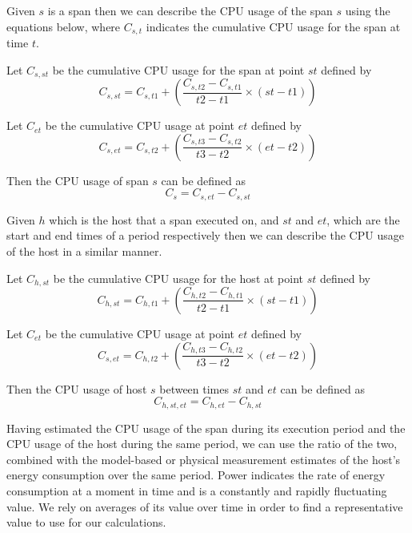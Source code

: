 Given $s$ is a span then we can describe the CPU usage of the span $s$ using the equations below, where $C_{s,t}$ indicates the cumulative CPU usage for the span at time $t$.

Let $C_{s, st}$ be the cumulative CPU usage for the span at point $st$ defined by
\begin{equation}
C_{s,st} = C_{s,t1} + \left( \frac{C_{s,t2} - C_{s,t1}}{t2 - t1} \times (st - t1) \right) 
\end{equation}

Let $C_{et}$ be the cumulative CPU usage at point $et$ defined by
\begin{equation}
C_{s,et} = C_{s,t2} + \left( \frac{C_{s,t3} - C_{s,t2}}{t3 - t2} \times (et - t2) \right) 
\end{equation}

Then the CPU usage of span $s$ can be defined as
\begin{equation}
C_{s} = C_{s,et} - C_{s,st}
\end{equation}

Given $h$ which is the host that a span executed on, and $st$ and $et$, which are the start and end times of a period respectively then we can describe the CPU usage of the host in a similar manner.

Let $C_{h, st}$ be the cumulative CPU usage for the host at point $st$ defined by
\begin{equation}
C_{h,st} = C_{h,t1} + \left( \frac{C_{h,t2} - C_{h,t1}}{t2 - t1} \times (st - t1) \right) 
\end{equation}

Let $C_{et}$ be the cumulative CPU usage at point $et$ defined by
\begin{equation}
C_{s,et} = C_{h,t2} + \left( \frac{C_{h,t3} - C_{h,t2}}{t3 - t2} \times (et - t2) \right) 
\end{equation}

Then the CPU usage of host $s$ between times $st$ and $et$ can be defined as
\begin{equation}
C_{h,st,et} = C_{h,et} - C_{h,st}
\end{equation}

Having estimated the CPU usage of the span during its execution period and the CPU usage of the host during the same period, we can use the ratio of the two, combined with the model-based or physical measurement estimates of the host's energy consumption over the same period.  Power indicates the rate of energy consumption at a moment in time and is a constantly and rapidly fluctuating value. We rely on averages of its value over time in order to find a representative value to use for our calculations.

